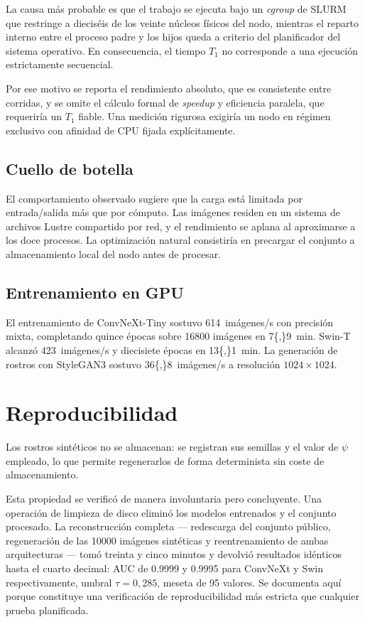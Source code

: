\documentclass[10pt,twocolumn,letterpaper]{article}
\begin{document}
La causa más probable es que el trabajo se ejecuta bajo un \emph{cgroup} de
SLURM que restringe a dieciséis de los veinte núcleos físicos del nodo,
mientras el reparto interno entre el proceso padre y los hijos queda a
criterio del planificador del sistema operativo. En consecuencia, el
tiempo $T_1$ no corresponde a una ejecución estrictamente secuencial.

Por ese motivo se reporta el rendimiento absoluto, que es consistente entre
corridas, y se omite el cálculo formal de \emph{speedup} y eficiencia
paralela, que requeriría un $T_1$ fiable. Una medición rigurosa exigiría un
nodo en régimen exclusivo con afinidad de CPU fijada explícitamente.

\subsection{Cuello de botella}

El comportamiento observado sugiere que la carga está limitada por
entrada/salida más que por cómputo. Las imágenes residen en un sistema de
archivos Lustre compartido por red, y el rendimiento se aplana al
aproximarse a los doce procesos. La optimización natural consistiría en
precargar el conjunto a almacenamiento local del nodo antes de procesar.

\subsection{Entrenamiento en GPU}

El entrenamiento de ConvNeXt-Tiny sostuvo \num{614}~im\'agenes/s con
precisión mixta, completando quince épocas sobre \num{16800} imágenes en
\SI{7{,}9}{\minute}. Swin-T alcanzó \num{423}~im\'agenes/s y
diecisiete épocas en \SI{13{,}1}{\minute}. La generación de rostros con
StyleGAN3 sostuvo \num{36{,}8}~im\'agenes/s a resolución
$1024\times1024$.

\section{Reproducibilidad}

Los rostros sintéticos no se almacenan: se registran sus semillas y el
valor de $\psi$ empleado, lo que permite regenerarlos de forma determinista
sin coste de almacenamiento.

Esta propiedad se verificó de manera involuntaria pero concluyente. Una
operación de limpieza de disco eliminó los modelos entrenados y el conjunto
procesado. La reconstrucción completa --- redescarga del conjunto público,
regeneración de las \num{10000} imágenes sintéticas y reentrenamiento de
ambas arquitecturas --- tomó treinta y cinco minutos y devolvió resultados
idénticos hasta el cuarto decimal: AUC de \num{0.9999} y \num{0.9995} para
ConvNeXt y Swin respectivamente, umbral $\tau=0{,}285$, meseta de
\num{95} valores. Se documenta aquí porque constituye una verificación de
reproducibilidad más estricta que cualquier prueba planificada.
\end{document}
